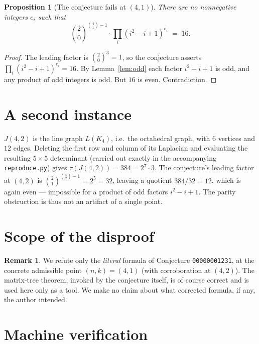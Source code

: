 \documentclass[11pt]{article}
\newtheorem{proposition}{Proposition}
\theoremstyle{definition}
\newtheorem{remark}{Remark}
\begin{document}
\begin{proposition}[The conjecture fails at $(4,1)$]\label{prop:main}
There are no nonnegative integers $e_i$ such that
\[
\binom{2}{0}^{\binom{4}{1}-1}\cdot\prod_i (i^2-i+1)^{e_i} \;=\; 16 .
\]
\end{proposition}
\begin{proof}
The leading factor is $\binom{2}{0}^{3}=1$, so the conjecture asserts
$\prod_i (i^2-i+1)^{e_i} = 16$. By Lemma~\ref{lem:odd} each factor $i^2-i+1$ is odd,
and any product of odd integers is odd. But $16$ is even. Contradiction.
\end{proof}

\section{A second instance}

$J(4,2)$ is the line graph $L(K_4)$, i.e.\ the octahedral graph, with $6$ vertices and
$12$ edges. Deleting the first row and column of its Laplacian and evaluating the
resulting $5\times5$ determinant (carried out exactly in the accompanying
\texttt{reproduce.py}) gives
$\tau(J(4,2)) = 384 = 2^7 \cdot 3$. The conjecture's leading factor at $(4,2)$ is
$\binom{2}{1}^{\binom{4}{2}-1} = 2^5 = 32$, leaving a quotient $384/32 = 12$, which is
again even --- impossible for a product of odd factors $i^2-i+1$. The parity obstruction
is thus not an artifact of a single point.

\section{Scope of the disproof}

\begin{remark}
We refute only the \emph{literal} formula of Conjecture \texttt{00000001231}, at the
concrete admissible point $(n,k)=(4,1)$ (with corroboration at $(4,2)$). The
matrix-tree theorem, invoked by the conjecture itself, is of course correct and is used
here only as a tool. We make no claim about what corrected formula, if any, the author
intended.
\end{remark}

\section{Machine verification}
\end{document}
